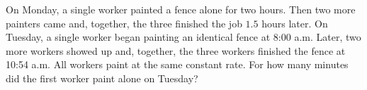 On Monday, a single worker painted a fence alone for two hours. Then two more painters came and, together, the three finished the job $1.5$ hours later. On Tuesday, a single worker began painting an identical fence at 8:00 a.m. Later, two more workers showed up and, together, the three workers finished the fence at 10:54 a.m. All workers paint at the same constant rate. For how many minutes did the first worker paint alone on Tuesday?
